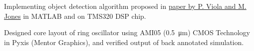 \documentclass[]{deedy}
\begin{document}
\begin{minipage}[t]{0.72\textwidth}
\begin{flushleft}
%
%
\vspace{5pt} %
\begin{tightemize}
\item Implementing object detection algorithm proposed in \href{https://www.cs.cmu.edu/~efros/courses/LBMV07/Papers/viola-cvpr-01.pdf}{paper by P. Viola and M. Jones} in MATLAB and on TMS320 DSP chip.
\end{tightemize}
\sectionsep
%
\begin{tightemize}
\item Designed core layout of ring oscillator using AMI05 (\SI{0.5}{\micro\metre}) CMOS Technology in Pyxis (Mentor Graphics), and verified output of back annotated simulation.
\end{tightemize}
\sectionsep
%

\end{flushleft}
\end{minipage}
\end{document}
